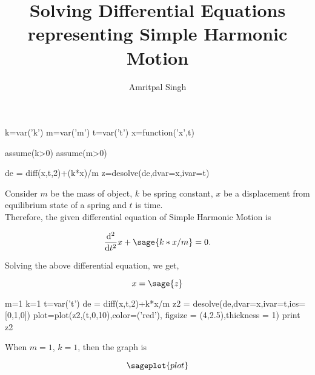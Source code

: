 \documentclass{article}
\title{Solving Differential Equations representing Simple Harmonic Motion}
\author{Amritpal Singh}
\begin{document}
\maketitle

\begin{sagesilent}
k=var('k')
m=var('m')
t=var('t')
x=function('x',t)

assume(k>0)
assume(m>0)

de = diff(x,t,2)+(k*x)/m
z=desolve(de,dvar=x,ivar=t)
\end{sagesilent}
Consider $m$ be the mass of object, $k$ be spring constant, $x$ be a displacement from equilibrium state of a spring and $t$ is time. 
\\Therefore, the given differential equation of Simple Harmonic Motion is  

\begin{comment}
\begin{sagesilent}
F=var('F') 
a=var('a')
\end{sagesilent}

\[
 \sage{F==m*a} --1 \\ 
 \sage{F==-k*x} --2
\]
\end{comment}

\[
  \frac{\mathrm{d}^{2}}{\mathrm{d}t^{2}}x +  \sage{k*x/m} = 0.
\]


Solving the above differential equation, we get,

$$x = \sage{z}$$












\begin{sagesilent}
m=1
k=1
t=var('t')
de = diff(x,t,2)+k*x/m
z2 = desolve(de,dvar=x,ivar=t,ics=[0,1,0])
plot=plot(z2,(t,0,10),color=('red'), figsize = (4,2.5),thickness = 1)
print z2
\end{sagesilent}


When $m=1$, $k=1$, then the graph is

$$\sageplot{plot}$$
\end{document}
